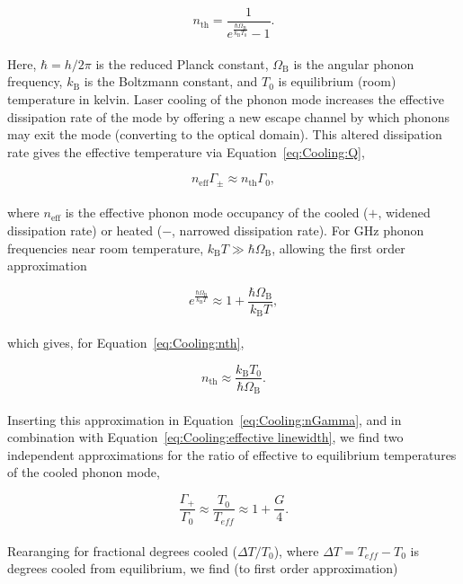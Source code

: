 \begin{equation}
  n_{\mathrm{th}} = \frac{1}{e^\frac{\hbar\Omega_{\mathrm{B}}}{k_{\mathrm{B}}T_{0}} - 1}.
  \label{eq:Cooling:nth}
\end{equation}
\\
Here, \(\hbar = h/2\pi\) is the reduced Planck constant, \(\Omega_{\mathrm{B}}\) is the angular phonon frequency, \(k_{\mathrm{B}}\) is the Boltzmann constant, and \(T_{0}\) is equilibrium (room) temperature in kelvin. Laser cooling of the phonon mode increases the effective dissipation rate of the mode by offering a new escape channel by which phonons may exit the mode (converting to the optical domain). This altered dissipation rate gives the effective temperature via Equation~\ref{eq:Cooling:Q},

\begin{equation}
  n_{\mathrm{eff}}\Gamma_{\mathrm{\pm}} \approx n_{\mathrm{th}}\Gamma_{0},
  \label{eq:Cooling:nGamma}
\end{equation}
\\
where \(n_{\mathrm{eff}}\) is the effective phonon mode occupancy of the cooled (\(+\), widened dissipation rate) or heated (\(-\), narrowed dissipation rate). For \si{\giga\hertz} phonon frequencies near room temperature, \(k_{\mathrm{B}}T \gg \hbar\Omega_{\mathrm{B}}\), allowing the first order approximation

\begin{equation}
  e^{\frac{\hbar\Omega_{\mathrm{B}}}{k_{\mathrm{B}}T}} \approx 1 + \frac{\hbar\Omega_{\mathrm{B}}}{k_{\mathrm{B}}T},
\end{equation}
\\
which gives, for Equation~\ref{eq:Cooling:nth},

\begin{equation}
  n_{\mathrm{th}} \approx \frac{k_{\mathrm{B}}T_{0}}{\hbar\Omega_{\mathrm{B}}}.
\end{equation}
\\
Inserting this approximation in Equation~\ref{eq:Cooling:nGamma}, and in combination with Equation~\ref{eq:Cooling:effective linewidth}, we find two independent approximations for the ratio of effective to equilibrium temperatures of the cooled phonon mode,

\begin{equation}
  \frac{\Gamma_{+}}{\Gamma_{0}} \approx \frac{T_{0}}{T_{eff}} \approx 1 + \frac{G}{4}.
\end{equation}
\\
Rearanging for fractional degrees cooled (\(\Delta T/T_{0}\)), where \(\Delta T = T_{eff} - T_{0}\) is degrees cooled from equilibrium, we find (to first order approximation)

